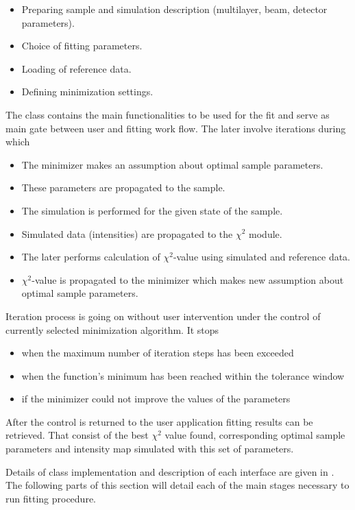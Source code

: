 \begin{itemize}
\item Preparing sample and simulation description (multilayer, beam, detector parameters).
\item Choice of fitting parameters.
\item Loading of reference data.
\item Defining minimization settings.
\end{itemize}

The class  contains the main functionalities to be used for the fit
and serve as main gate between user and fitting work flow. 
The later involve iterations during which

\begin{itemize}
\item The minimizer makes an assumption about optimal sample parameters.
\item These parameters are propagated to the sample.
\item The simulation is performed for the given state of the sample.
\item Simulated data (intensities) are propagated to the $\chi^2$ module.
\item The later performs calculation of $\chi^2$-value using simulated and reference data.
\item $\chi^2$-value is propagated to the minimizer which makes new assumption about optimal sample parameters.
\end{itemize}

Iteration process is going on without user intervention under the control of currently selected minimization algorithm. It stops 
\begin{itemize}
\item when the maximum number of iteration steps has been exceeded
\item when the function's minimum has been reached within the tolerance window 
\item if the minimizer could not improve the values of the parameters 
\end{itemize}

After the control is returned to the user application fitting results can be retrieved.
That consist of the best $\chi^2$ value found, corresponding optimal sample parameters and intensity map simulated with this set of parameters.

Details of  class implementation and description
of each interface are given in . The following parts of this section will detail each of
the main stages necessary to run fitting procedure.


